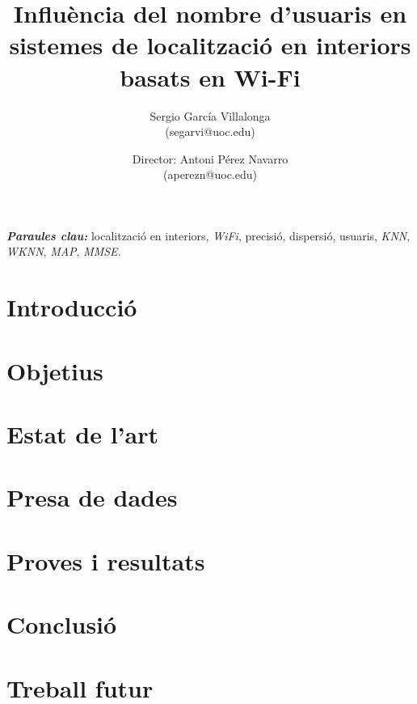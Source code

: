 \documentclass[a4paper, 10pt, twocolumn]{article}
\title{Influència del nombre d'usuaris en sistemes de localització en interiors basats en Wi-Fi}
\author{Sergio García Villalonga \\
          (segarvi@uoc.edu)
          \and Director: Antoni Pérez Navarro \\
          (aperezn@uoc.edu)}
\providecommand{\keywords}[1]{\textbf{\textit{Paraules clau:}} #1}
\begin{document}
\maketitle



\keywords{localització en interiors, \textit{WiFi}, precisió, dispersió, usuaris, \textit{KNN}, \textit{WKNN}, \textit{MAP}, \textit{MMSE}.}

\section{Introducció}

 
\section{Objetius}


\section{Estat de l'art}


\section{Presa de dades}


\section{Proves i resultats}


\section{Conclusió}


\section{Treball futur}





%
%
\end{document}
